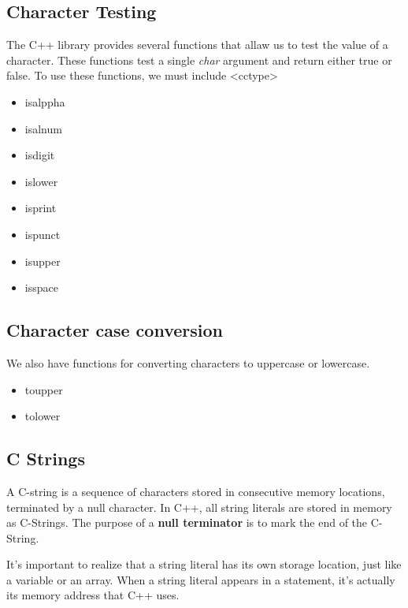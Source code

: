 \documentclass{report}
\begin{document}
    \subsection{Character Testing}
    \bigbreak \noindent 
    The C++ library provides several functions that allaw us to test the value of a character. These functions test a single \textit{char} argument and return either true or false.
    \bigbreak \noindent 
    To use these functions, we must include <cctype>
    \begin{itemize}
        \item isalppha
        \item isalnum
        \item isdigit
        \item islower
        \item isprint
        \item ispunct
        \item isupper
        \item isspace
    \end{itemize}

    \bigbreak \noindent 
    \subsection{Character case conversion}
    \bigbreak \noindent 
    We also have functions for converting characters to uppercase or lowercase.
    \begin{itemize}
        \item toupper
        \item tolower
    \end{itemize}

    \bigbreak \noindent 
    \subsection{C Strings }
    \bigbreak \noindent 
    \begin{concept}
 A C-string is a sequence of characters stored in consecutive memory locations, terminated by a null character. In C++, all string literals are stored in memory as C-Strings. The purpose of  a \textbf{null terminator} is to mark the end of the C-String.
	\end{concept}
    \bigbreak \noindent 
    It's important to realize that a string literal has its own storage location, just like a variable or an array. When a string literal appears in a statement, it's actually its memory address that C++ uses. 
\end{document}

